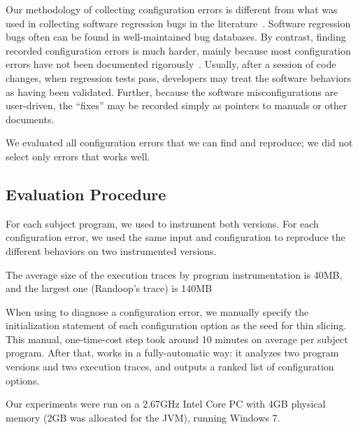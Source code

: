 Our methodology of collecting
configuration errors is different from what was used in
collecting software regression bugs in the literature~\cite{dd, autoflow}.
Software regression bugs often can be found in well-maintained
bug databases. By contrast, finding recorded configuration errors
is much harder, mainly because most configuration errors have not been
documented rigorously~\cite{Yin:2011:ESC}. Usually, after a
session of code changes, when regression tests pass, developers
may treat the software behaviors as having been validated. Further,
because the software misconfigurations are user-driven,
the ``fixes'' may be recorded simply as pointers
to manuals or other documents. 

We evaluated all configuration errors that we can find and reproduce;
we did not select only errors that \ourtool works well.





\subsection{Evaluation Procedure}

For each subject program, we used \ourtool to instrument both versions. 
For each configuration error, we used the same 
input and configuration
to reproduce the different behaviors on two instrumented versions.

The average size of the execution traces by program instrumentation is 40MB,
and the largest one (Randoop's trace) is 140MB



When using \ourtool to diagnose a configuration error, we manually specify
the initialization statement of each configuration option as
the seed for thin slicing. This manual, one-time-cost step took around
10 minutes on average per subject program. After that,
\ourtool works in a fully-automatic way: it 
analyzes two program versions and two execution traces,
and outputs a ranked list of configuration options.

Our experiments were run on a 2.67GHz Intel Core PC
with 4GB physical memory (2GB was allocated for the JVM),
running Windows 7.

